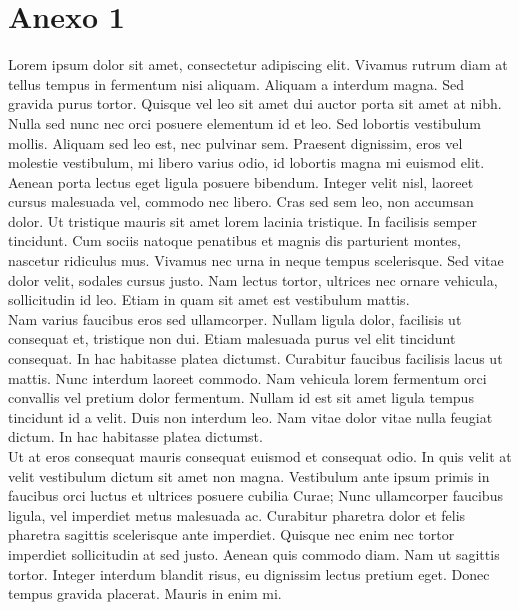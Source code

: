 
\chapter{Anexo 1}

Lorem ipsum dolor sit amet, consectetur adipiscing elit. Vivamus rutrum diam at tellus tempus in fermentum nisi aliquam. Aliquam a interdum magna. Sed gravida purus tortor. Quisque vel leo sit amet dui auctor porta sit amet at nibh. Nulla sed nunc nec orci posuere elementum id et leo. Sed lobortis vestibulum mollis. Aliquam sed leo est, nec pulvinar sem. Praesent dignissim, eros vel molestie vestibulum, mi libero varius odio, id lobortis magna mi euismod elit. Aenean porta lectus eget ligula posuere bibendum. Integer velit nisl, laoreet cursus malesuada vel, commodo nec libero. Cras sed sem leo, non accumsan dolor. Ut tristique mauris sit amet lorem lacinia tristique. In facilisis semper tincidunt. Cum sociis natoque penatibus et magnis dis parturient montes, nascetur ridiculus mus. Vivamus nec urna in neque tempus scelerisque. Sed vitae dolor velit, sodales cursus justo. Nam lectus tortor, ultrices nec ornare vehicula, sollicitudin id leo. Etiam in quam sit amet est vestibulum mattis.\\

Nam varius faucibus eros sed ullamcorper. Nullam ligula dolor, facilisis ut consequat et, tristique non dui. Etiam malesuada purus vel elit tincidunt consequat. In hac habitasse platea dictumst. Curabitur faucibus facilisis lacus ut mattis. Nunc interdum laoreet commodo. Nam vehicula lorem fermentum orci convallis vel pretium dolor fermentum. Nullam id est sit amet ligula tempus tincidunt id a velit. Duis non interdum leo. Nam vitae dolor vitae nulla feugiat dictum. In hac habitasse platea dictumst.\\

Ut at eros consequat mauris consequat euismod et consequat odio. In quis velit at velit vestibulum dictum sit amet non magna. Vestibulum ante ipsum primis in faucibus orci luctus et ultrices posuere cubilia Curae; Nunc ullamcorper faucibus ligula, vel imperdiet metus malesuada ac. Curabitur pharetra dolor et felis pharetra sagittis scelerisque ante imperdiet. Quisque nec enim nec tortor imperdiet sollicitudin at sed justo. Aenean quis commodo diam. Nam ut sagittis tortor. Integer interdum blandit risus, eu dignissim lectus pretium eget. Donec tempus gravida placerat. Mauris in enim mi.\\

